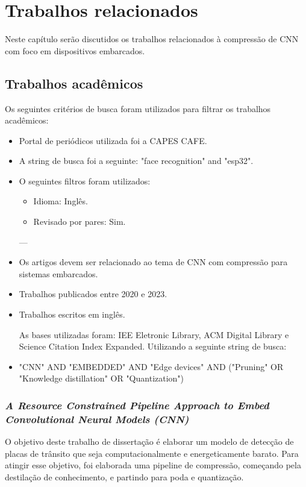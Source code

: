 \chapter{Trabalhos relacionados}\label{cap_trabalhos_relacionados}

Neste capítulo serão discutidos os trabalhos relacionados à compressão de CNN com foco em dispositivos
embarcados.

\section{Trabalhos acadêmicos}

Os seguintes critérios de busca foram utilizados para filtrar os trabalhos acadêmicos:

\begin{itemize}
	\item Portal de periódicos utilizada foi a CAPES CAFE.
	\item A string de busca foi a seguinte: "face recognition" and "esp32".
	\item O seguintes filtros foram utilizados:
	\begin{itemize}
		\item Idioma: Inglês.
		\item Revisado por pares: Sim.
	\end{itemize}
---
	\item Os artigos devem ser relacionado ao tema de CNN com compressão para sistemas embarcados.
	\item Trabalhos publicados entre 2020 e 2023.
	\item Trabalhos escritos em inglês.

	As bases utilizadas foram: IEE Eletronic Library, ACM Digital Library e Science Citation Index Expanded.
	Utilizando a seguinte string de busca:
	\item "CNN"  AND "EMBEDDED" AND "Edge devices" AND ("Pruning" OR "Knowledge distillation" OR "Quantization")
\end{itemize}

\subsection{\textit{A Resource Constrained Pipeline Approach to Embed Convolutional Neural Models (CNN)}}
O objetivo deste trabalho de dissertação \cite{rafael} é elaborar um modelo de detecção de placas de trânsito que seja
computacionalmente e energeticamente barato. Para atingir esse objetivo, foi elaborada uma pipeline de compressão,
começando pela destilação de conhecimento, e partindo para poda e quantização.

